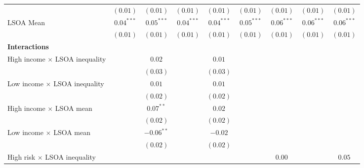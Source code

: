 \documentclass[12pt, letter]{scrartcl}
\begin{document}
\begin{table}[t]
{\begin{tabular}{l c c c c c c c c}
                                            & $(0.01)$      & $(0.01)$      & $(0.01)$      & $(0.01)$      & $(0.01)$      & $(0.01)$      & $(0.01)$      & $(0.01)$      \\
LSOA Mean                                   & $0.04^{***}$  & $0.05^{***}$  & $0.04^{***}$  & $0.04^{***}$  & $0.05^{***}$  & $0.06^{***}$  & $0.06^{***}$  & $0.06^{***}$  \\
                                            & $(0.01)$      & $(0.01)$      & $(0.01)$      & $(0.01)$      & $(0.01)$      & $(0.01)$      & $(0.01)$      & $(0.01)$      \\
\multicolumn{5}{l}{\textbf{Interactions}} \\[5pt]
High income $\times$ LSOA inequality        &               & $0.02$        &               & $0.01$        &               &               &               &               \\
                                            &               & $(0.03)$      &               & $(0.03)$      &               &               &               &               \\
Low income $\times$ LSOA inequality         &               & $0.01$        &               & $0.01$        &               &               &               &               \\
                                            &               & $(0.02)$      &               & $(0.02)$      &               &               &               &               \\
High income $\times$ LSOA mean              &               & $0.07^{**}$   &               & $0.02$        &               &               &               &               \\
                                            &               & $(0.02)$      &               & $(0.02)$      &               &               &               &               \\
Low income $\times$ LSOA mean               &               & $-0.06^{**}$  &               & $-0.02$       &               &               &               &               \\
                                            &               & $(0.02)$      &               & $(0.02)$      &               &               &               &               \\
High risk $\times$ LSOA inequality          &               &               &               &               &               & $0.00$        &               & $0.05$        \\

\end{tabular}}
\end{table}
\end{document}
